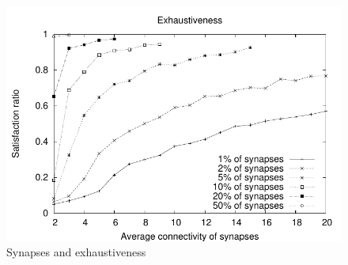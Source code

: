 \begin{figure}
        \includegraphics[width=\linewidth]{fig/3D-sat.pdf}
        \caption{Synapses and exhaustiveness\label{fig:3D-sat}}
\end{figure}

